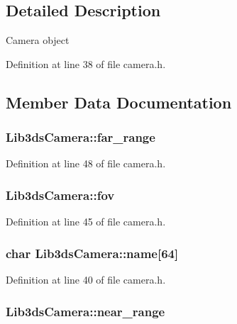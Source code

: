 \subsection{Detailed Description}
Camera object 

Definition at line 38 of file camera.\-h.



\subsection{Member Data Documentation}
\hypertarget{struct_lib3ds_camera_a77f7c7aa50cd42ba53995147c57a37b0}{
\subsubsection[{far\-\_\-range}]{ Lib3ds\-Camera\-::far\-\_\-range}}\label{struct_lib3ds_camera_a77f7c7aa50cd42ba53995147c57a37b0}


Definition at line 48 of file camera.\-h.

\hypertarget{struct_lib3ds_camera_a39eda62ee0768a1ae5c73c505677d904}{
\subsubsection[{fov}]{ Lib3ds\-Camera\-::fov}}\label{struct_lib3ds_camera_a39eda62ee0768a1ae5c73c505677d904}


Definition at line 45 of file camera.\-h.

\hypertarget{struct_lib3ds_camera_a72643a8a401382a4f11e4801ea9a9b35}{
\subsubsection[{name}]{\setlength{\rightskip}{0pt plus 5cm}char Lib3ds\-Camera\-::name\mbox{[}64\mbox{]}}}\label{struct_lib3ds_camera_a72643a8a401382a4f11e4801ea9a9b35}


Definition at line 40 of file camera.\-h.

\hypertarget{struct_lib3ds_camera_af0b2a0e7a0b316b88f00e4bdb859e9ad}{
\subsubsection[{near\-\_\-range}]{ Lib3ds\-Camera\-::near\-\_\-range}}\label{struct_lib3ds_camera_af0b2a0e7a0b316b88f00e4bdb859e9ad}


